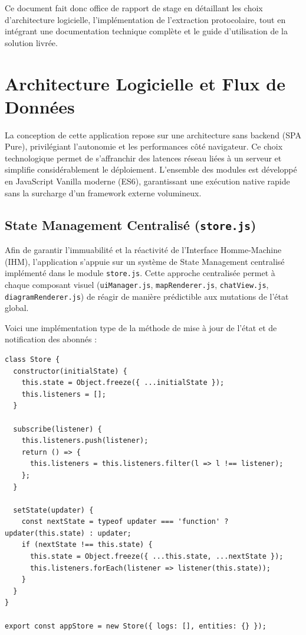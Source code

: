 \documentclass[a4paper,11pt]{report}
\begin{document}
Ce document fait donc office de rapport de stage en détaillant les choix d'architecture logicielle, l'implémentation de l'extraction protocolaire, tout en intégrant une documentation technique complète et le guide d'utilisation de la solution livrée.

\chapter{Architecture Logicielle et Flux de Données}

La conception de cette application repose sur une architecture sans backend (SPA Pure), privilégiant l'autonomie et les performances côté navigateur. Ce choix technologique permet de s'affranchir des latences réseau liées à un serveur et simplifie considérablement le déploiement. L'ensemble des modules est développé en JavaScript Vanilla moderne (ES6), garantissant une exécution native rapide sans la surcharge d'un framework externe volumineux.

\section{State Management Centralisé (\texttt{store.js})}
Afin de garantir l'immuabilité et la réactivité de l'Interface Homme-Machine (IHM), l'application s'appuie sur un système de State Management centralisé implémenté dans le module \texttt{store.js}. Cette approche centralisée permet à chaque composant visuel (\texttt{uiManager.js}, \texttt{mapRenderer.js}, \texttt{chatView.js}, \texttt{diagramRenderer.js}) de réagir de manière prédictible aux mutations de l'état global.

Voici une implémentation type de la méthode de mise à jour de l'état et de notification des abonnés :

\begin{lstlisting}[caption={Implémentation type de la méthode \texttt{setState} et \texttt{subscribe} dans le Store}]
class Store {
  constructor(initialState) {
    this.state = Object.freeze({ ...initialState });
    this.listeners = [];
  }

  subscribe(listener) {
    this.listeners.push(listener);
    return () => {
      this.listeners = this.listeners.filter(l => l !== listener);
    };
  }

  setState(updater) {
    const nextState = typeof updater === 'function' ? updater(this.state) : updater;
    if (nextState !== this.state) {
      this.state = Object.freeze({ ...this.state, ...nextState });
      this.listeners.forEach(listener => listener(this.state));
    }
  }
}

export const appStore = new Store({ logs: [], entities: {} });
\end{lstlisting}
\end{document}
